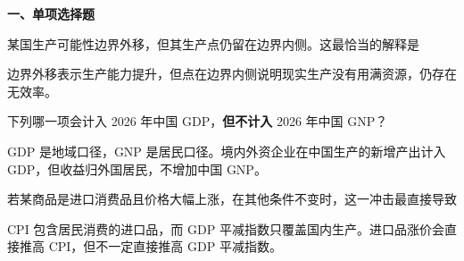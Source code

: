 ﻿


\textbf{一、单项选择题}

\begin{question}
某国生产可能性边界外移，但其生产点仍留在边界内侧。这最恰当的解释是
\begin{choiceoptions}[2]
\end{choiceoptions}
\begin{solution}
边界外移表示生产能力提升，但点在边界内侧说明现实生产没有用满资源，仍存在无效率。
\end{solution}
\end{question}

\begin{question}
下列哪一项会计入 2026 年中国 GDP，\textbf{但不计入} 2026 年中国 GNP？
\begin{choiceoptions}[1]
\end{choiceoptions}
\begin{solution}
GDP 是地域口径，GNP 是居民口径。境内外资企业在中国生产的新增产出计入 GDP，但收益归外国居民，不增加中国 GNP。
\end{solution}
\end{question}

\begin{question}
若某商品是进口消费品且价格大幅上涨，在其他条件不变时，这一冲击最直接导致
\begin{choiceoptions}[2]
\end{choiceoptions}
\begin{solution}
CPI 包含居民消费的进口品，而 GDP 平减指数只覆盖国内生产。进口品涨价会直接推高 CPI，但不一定直接推高 GDP 平减指数。
\end{solution}
\end{question}

